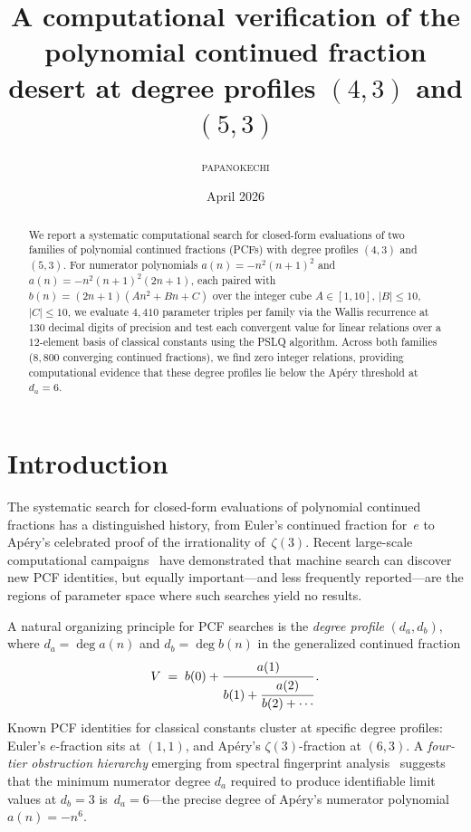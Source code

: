 \documentclass[11pt]{amsart}
\title[PCF desert at degree profiles $(4,3)$ and $(5,3)$]%
{A computational verification of the polynomial continued fraction
desert at degree profiles $(4,3)$ and $(5,3)$}
\author{\textsc{papanokechi}}
\date{April 2026}
\theoremstyle{plain}
\theoremstyle{remark}
\begin{document}
\begin{abstract}
We report a systematic computational search for closed-form evaluations
of two families of polynomial continued fractions (PCFs) with degree
profiles $(4,3)$ and $(5,3)$.
For numerator polynomials $a(n) = -n^2(n+1)^2$ and
$a(n) = -n^2(n+1)^2(2n+1)$, each paired with
$b(n) = (2n+1)(An^2 + Bn + C)$ over the integer cube
$A \in [1,10]$, $|B| \leq 10$, $|C| \leq 10$,
we evaluate $4{,}410$ parameter triples per family via the
Wallis recurrence at $130$ decimal digits of precision
and test each convergent value for linear relations over a
$12$-element basis of classical constants using the PSLQ algorithm.
Across both families ($8{,}800$ converging continued fractions),
we find zero integer relations,
providing computational evidence that these degree profiles
lie below the Ap\'ery threshold at $d_a = 6$.
\end{abstract}

\maketitle

\section{Introduction}

The systematic search for closed-form evaluations of polynomial
continued fractions has a distinguished history, from Euler's
continued fraction for~$e$ to Ap\'ery's celebrated proof of
the irrationality of~$\zeta(3)$.
Recent large-scale computational campaigns~\cite{raayoni2021}
have demonstrated that machine search can discover new PCF identities,
but equally important---and less frequently reported---are the
regions of parameter space where such searches yield no results.

A natural organizing principle for PCF searches is the
\emph{degree profile} $(d_a, d_b)$,
where $d_a = \deg a(n)$ and $d_b = \deg b(n)$ in the
generalized continued fraction
\begin{equation}\label{eq:gcf}
  V \;=\; b(0) + \cfrac{a(1)}{b(1)
    + \cfrac{a(2)}{b(2) + \cdots}}\,.
\end{equation}
Known PCF identities for classical constants cluster at specific
degree profiles:
Euler's $e$-fraction sits at $(1,1)$,
and Ap\'ery's $\zeta(3)$-fraction at $(6,3)$.
A \emph{four-tier obstruction hierarchy} emerging from spectral
fingerprint analysis~\cite{spectral}
suggests that the minimum numerator degree $d_a$ required to
produce identifiable limit values at $d_b = 3$ is~$d_a = 6$---the
precise degree of Ap\'ery's numerator polynomial $a(n) = -n^6$.
\end{document}
